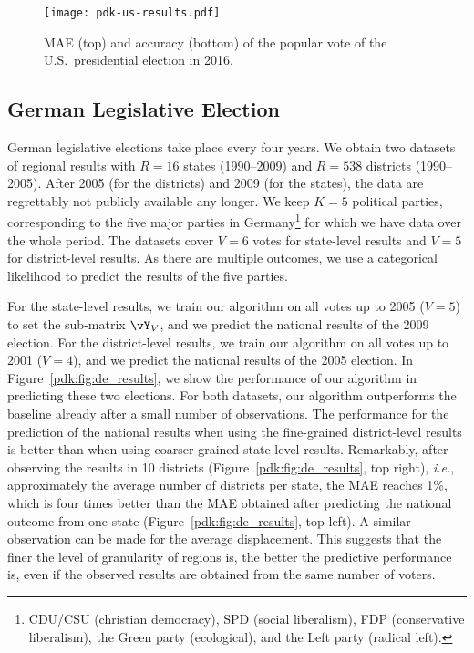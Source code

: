 \begin{figure}
	\texttt{[image: pdk-us-results.pdf]}
	\caption{MAE (top) and accuracy (bottom) of the popular vote of the U.S.\ presidential election in 2016.}
	\label{pdk:fig:us_results}
\end{figure}

\subsection{German Legislative Election}

German legislative elections take place every four years.
We obtain two datasets~\cite{norsk2020germany} of regional results with $R=16$ states (1990--2009) and $R=538$ districts (1990--2005).
After 2005 (for the districts) and 2009 (for the states), the data are regrettably not publicly available any longer.
We keep $K = 5$ political parties, corresponding to the five major parties in Germany\footnote{CDU/CSU (christian democracy), SPD (social liberalism), FDP (conservative liberalism), the Green party (ecological), and the Left party (radical left).} for which we have data over the whole period.
The datasets cover $V=6$ votes for state-level results and $V=5$ for district-level results.
As there are multiple outcomes, we use a categorical likelihood to predict the results of the five parties.

For the state-level results, we train our algorithm on all votes up to 2005 ($V = 5$) to set the sub-matrix $\vY_V$, and we predict the national results of the 2009 election.
For the district-level results, we train our algorithm on all votes up to 2001 ($V = 4$), and we predict the national results of the 2005 election.
In Figure~\ref{pdk:fig:de_results}, we show the performance of our algorithm in predicting these two elections.
For both datasets, our algorithm outperforms the baseline already after a small number of observations.
The performance for the prediction of the national results when using the fine-grained district-level results is better than when using coarser-grained state-level results.
Remarkably, after observing the results in 10 districts (Figure~\ref{pdk:fig:de_results}, top right), \textit{i.e.}, approximately the average number of districts per state, the MAE reaches 1\%, which is four times better than the MAE obtained after predicting the national outcome from one state (Figure~\ref{pdk:fig:de_results}, top left).
A similar observation can be made for the average displacement.
This suggests that the finer the level of granularity of regions is, the better the predictive performance is, even if the observed results are obtained from the same number of voters.

